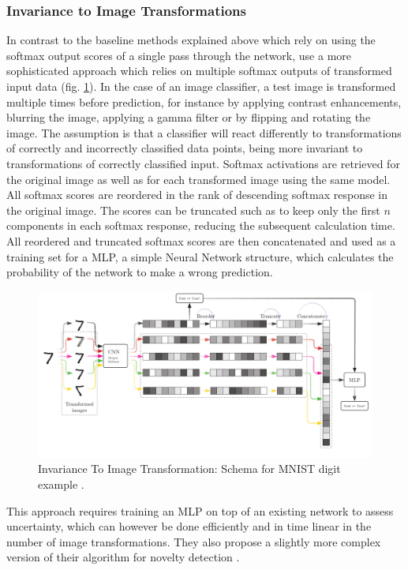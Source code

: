 \documentclass[10pt]{article}
\begin{document}
\subsubsection{Invariance to Image Transformations}
In contrast to the baseline methods explained above which rely on using the softmax output scores of a single pass through the network, \textcite{Bahat_2018} use a more sophisticated approach which relies on multiple softmax outputs of transformed input data (fig. \ref{fig:schema-baseline1}). In the case of an image classifier, a test image is transformed multiple times before prediction, for instance by applying contrast enhancements, blurring the image, applying a gamma filter or by flipping and rotating the image. The assumption is that a classifier will react differently to transformations of correctly and incorrectly classified data points, being more invariant to transformations of correctly classified input. Softmax activations are retrieved for the original image as well as for each transformed image using the same model. All softmax scores are reordered in the rank of descending softmax response in the original image. The scores can be truncated such as to keep only the first $n$ components in each softmax response, reducing the subsequent calculation time. All reordered and truncated softmax scores are then concatenated and used as a training set for a \gls{MLP}, a simple Neural Network structure, which calculates the probability of the network to make a wrong prediction.

\begin{figure}[H]
    \centering
    \includegraphics[width=\textwidth]{Schema/schema_baseline_1}
    \caption{Invariance To Image Transformation: Schema for \gls{MNIST} digit example \cite{Bahat_2018}.}
    \label{fig:schema-baseline1}
\end{figure}

This approach requires training an \gls{MLP} on top of an existing network to assess uncertainty, which can however be done efficiently and in time linear in the number of image transformations. They also propose a slightly more complex version of their algorithm for novelty detection \cite{Bahat_2018}.
\end{document}

